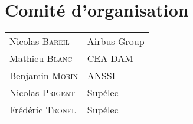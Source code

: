 
\section*{Comit\'e d'organisation}
\begin{tabular}{@{}p{5cm}@{}p{6.5cm}@{}}
  Nicolas  \textsc{Bareil}        & Airbus Group                                 \\
  Mathieu  \textsc{Blanc}         & CEA DAM                                      \\
  Benjamin  \textsc{Morin}        & ANSSI                                        \\
  Nicolas  \textsc{Prigent}       & Sup\'elec                                    \\
  Fr\'ed\'eric  \textsc{Tronel}   & Sup\'elec                                    \\
\end{tabular}

